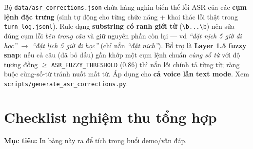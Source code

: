 \documentclass[12pt,a4paper]{article}
\newcommand{\role}[1]{\par\smallskip\noindent\textbf{\textcolor{hdr}{Mục tiêu:}} #1\par\smallskip}
\newcommand{\say}[1]{\textit{``#1''}}
\begin{document}
\begin{diembox}
Bộ \texttt{data/asr\_corrections.json} chứa hàng nghìn biến thể lỗi ASR của các
\textbf{cụm lệnh đặc trưng} (sinh tự động cho từng chức năng + khai thác lỗi thật
trong \texttt{turn\_log.jsonl}). Rule dạng \textbf{substring có ranh giới từ}
(\texttt{\textbackslash b...\textbackslash b}) nên sửa đúng cụm lỗi \emph{bên
trong câu} và giữ nguyên phần còn lại --- vd \say{đặt nịch 5 giờ đi học}
$\to$ \say{đặt lịch 5 giờ đi học} (chỉ nắn \say{đặt nịch}). Bổ trợ là
\textbf{Layer 1.5 fuzzy snap}: nếu cả câu (đã bỏ dấu) gần khớp một cụm lệnh chuẩn
\emph{cùng số từ} với độ tương đồng $\geq$ \texttt{ASR\_FUZZY\_THRESHOLD} (0.86)
thì nắn lỗi chính tả từng từ; ràng buộc cùng-số-từ tránh nuốt mất từ. Áp dụng cho
\textbf{cả voice lẫn text mode}. Xem \texttt{scripts/generate\_asr\_corrections.py}.
\end{diembox}

\section{Checklist nghiệm thu tổng hợp}
\role{In bảng này ra để tích trong buổi demo/vấn đáp.}
\end{document}
